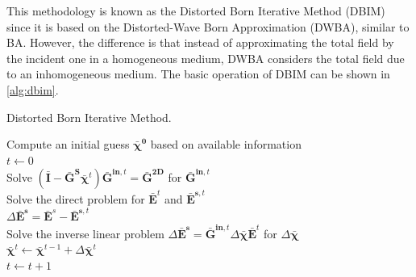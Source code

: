 			This methodology is known as the Distorted Born Iterative Method (DBIM) since it is based on the Distorted-Wave Born Approximation (DWBA), similar to BA. However, the difference is that instead of approximating the total field by the incident one in a homogeneous medium, DWBA considers the total field due to an inhomogeneous medium. The basic operation of DBIM can be shown in \autoref{alg:dbim}.
			\begin{algorithm}[!htb]
				\caption{Distorted Born Iterative Method.}
				\label{alg:dbim}
				Compute an initial guess $\boldsymbol{\bar{\chi}^0}$ based on available information \\
				$t\leftarrow0$ \\
				 {
					Solve $\left(\mathbf{\bar{I}} - \mathbf{\bar{G}^S}\boldsymbol{\bar{\chi}}^t\right)\mathbf{\bar{G}}^{\mathbf{in},t} = \mathbf{\bar{G}^{2D}}$ for $\mathbf{\bar{G}}^{\mathbf{in},t}$ \\
					Solve the direct problem for $\mathbf{\bar{E}}^t$ and $\mathbf{\bar{E}}^{\mathbf{s},t}$ \\
					$\Delta\mathbf{\bar{E}^s} = \mathbf{\bar{E}}^s - \mathbf{\bar{E}}^{\mathbf{s},t}$ \\
					Solve the inverse linear problem $\Delta\mathbf{\bar{E}^s} = \mathbf{\bar{G}}^{\mathbf{in},t}\Delta\boldsymbol{\bar{\chi}}\mathbf{\bar{E}}^t$ for $\Delta\boldsymbol{\bar{\chi}}$\\
					$\boldsymbol{\bar{\chi}}^t \leftarrow \boldsymbol{\bar{\chi}}^{t-1} + \Delta\boldsymbol{\bar{\chi}}^t$ \\
					$t\leftarrow t+1$\\
				}
			\end{algorithm}
		
